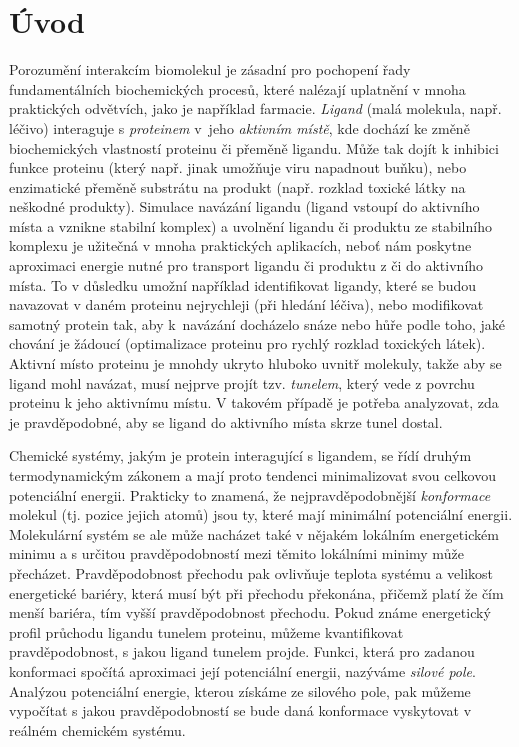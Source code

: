 \chapter*{Úvod}

Porozumění interakcím biomolekul je
zásadní pro pochopení řady fundamentálních biochemických procesů, které
nalézají uplatnění v mnoha praktických odvětvích, jako je například farmacie.
\textit{Ligand} (malá molekula, např. léčivo) interaguje s \textit{proteinem}
v~jeho \textit{aktivním místě}, kde dochází ke změně biochemických vlastností proteinu
či přeměně ligandu. Může tak dojít k inhibici funkce proteinu (který např.
jinak umožňuje viru napadnout buňku), nebo enzimatické přeměně substrátu na produkt
(např. rozklad toxické látky na neškodné produkty).
Simulace navázání ligandu (ligand vstoupí
do aktivního místa a vznikne stabilní komplex) a uvolnění ligandu či produktu ze stabilního komplexu
je užitečná v mnoha praktických
aplikacích, neboť nám poskytne aproximaci energie nutné pro transport ligandu či produktu z či do aktivního místa.
To v důsledku umožní například identifikovat ligandy, které se budou navazovat
v daném proteinu nejrychleji (při hledání léčiva), nebo modifikovat samotný protein tak,
aby k~navázání docházelo snáze nebo hůře podle toho, jaké chování je žádoucí (optimalizace
proteinu pro rychlý rozklad toxických látek). Aktivní
místo proteinu je mnohdy ukryto hluboko uvnitř molekuly, takže aby se ligand
mohl navázat, musí nejprve projít tzv. \textit{tunelem}, který vede z povrchu proteinu
k jeho aktivnímu místu. V takovém případě je potřeba analyzovat, zda je
pravděpodobné, aby se ligand do aktivního místa skrze tunel dostal.

Chemické systémy, jakým je protein interagující s ligandem, se řídí druhým
termodynamickým zákonem a mají proto tendenci minimalizovat svou
celkovou potenciální energii. Prakticky to znamená, že nejpravděpodobnější
\textit{konformace} molekul (tj. pozice jejich atomů) jsou ty, které mají minimální
potenciální energii. Molekulární systém se ale může nacházet také v nějakém
lokálním energetickém minimu a s určitou pravděpodobností mezi těmito lokálními
minimy může přecházet. Pravděpodobnost přechodu pak ovlivňuje teplota systému a
velikost energetické bariéry, která musí být při přechodu překonána, přičemž platí
že čím menší bariéra, tím vyšší pravděpodobnost přechodu. Pokud známe
energetický profil průchodu ligandu tunelem proteinu, můžeme kvantifikovat
pravděpodobnost, s jakou ligand tunelem projde. Funkci, která pro zadanou konformaci
spočítá aproximaci její potenciální energii, nazýváme \textit{silové pole}. Analýzou
potenciální energie, kterou získáme ze silového pole, pak můžeme vypočítat
s jakou pravděpodobností se bude daná konformace vyskytovat v reálném chemickém
systému.

